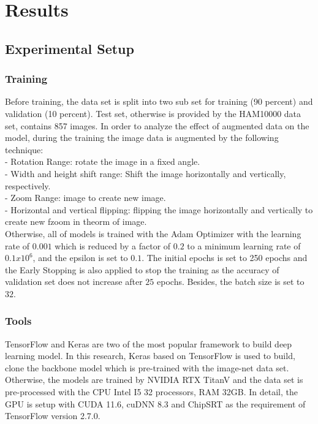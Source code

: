 \documentclass[sensors,article,submit,pdftex,moreauthors]{Definitions/mdpi}
\begin{document}
\section{Results}
\subsection{Experimental Setup}
\subsubsection{Training}
Before training, the data set is split into two sub set for training (90 percent) and validation (10 percent). Test set, otherwise is provided by the HAM10000 data set, contains 857 images. In order to analyze the effect of augmented data on the model, during the training the image data is augmented by the following technique:\\
- Rotation Range: rotate the image in a fixed angle. \\
- Width and height shift range: Shift the image horizontally and vertically, respectively. \\
- Zoom Range:  image to create new image. \\
- Horizontal and vertical flipping: flipping the image horizontally and vertically to create new fzoom in theorm of image.\\
Otherwise, all of models is trained with the Adam Optimizer \cite{6980} with the learning rate of $0.001$ which is reduced by a factor of $0.2$ to a minimum learning rate of $0.1 x 10^6$, and the epsilon is set to $0.1$. The initial epochs is set to 250 epochs and the Early Stopping is also applied to stop the training as the accuracy of validation set does not increase after $25$ epochs. Besides, the batch size is set to $32$.

\subsubsection{Tools}
TensorFlow and Keras are two of the most popular framework to build deep learning model. In this research, Keras based on TensorFlow is used to build, clone the backbone model which is pre-trained with the image-net data set. Otherwise, the models are trained by NVIDIA RTX TitanV and the data set is pre-processed with the CPU Intel I5 32 processors, RAM 32GB. In detail, the GPU is setup with CUDA 11.6, cuDNN 8.3 and ChipSRT as the requirement of TensorFlow version 2.7.0.
\end{document}
